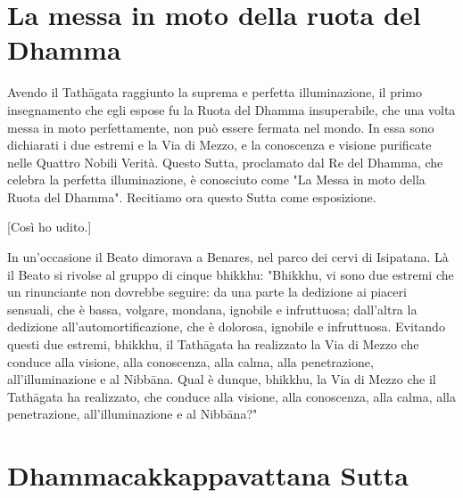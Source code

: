 \chapterTocDelegatePageNumber
\chapter{La messa in moto della ruota del Dhamma}

\setTocDelegatedPageNumber
\englishText
\renewcommand{\englishTitle}{La messa in moto della ruota del Dhamma}

\begin{leader}

Avendo il Tathāgata raggiunto la suprema e perfetta illuminazione,
 il primo insegnamento che egli espose fu la Ruota del Dhamma insuperabile,
  che una volta messa in moto perfettamente,
   non può essere fermata nel mondo.
    In essa sono dichiarati i due estremi e la Via di Mezzo,
     e la conoscenza e visione purificate nelle Quattro Nobili Verità.
      Questo Sutta, proclamato dal Re del Dhamma,
       che celebra la perfetta illuminazione,
        è conosciuto come "La Messa in moto della Ruota del Dhamma".
         Recitiamo ora questo Sutta come esposizione.

\end{leader}

[Così ho udito.]

In un'occasione il Beato dimorava a Benares, nel parco dei cervi di Isipatana.
Là il Beato si rivolse al gruppo di cinque bhikkhu:
"Bhikkhu, vi sono due estremi che un rinunciante non dovrebbe seguire:
 da una parte la dedizione ai piaceri sensuali, che è bassa, volgare, mondana, ignobile e infruttuosa;
  dall'altra la dedizione all'automortificazione, che è dolorosa, ignobile e infruttuosa.
Evitando questi due estremi, bhikkhu, il Tathāgata ha realizzato la Via di Mezzo che conduce alla visione, alla conoscenza,
 alla calma, alla penetrazione, all'illuminazione e al Nibbāna.
Qual è dunque, bhikkhu, la Via di Mezzo che il Tathāgata ha realizzato,
 che conduce alla visione, alla conoscenza, alla calma, alla penetrazione, all'illuminazione e al Nibbāna?"


\chapterTocSubIndentTrue
\chapter{Dhammacakkappavattana Sutta}

\paliText
\renewcommand{\paliTitle}{Dhammacakkappavattana Sutta}

